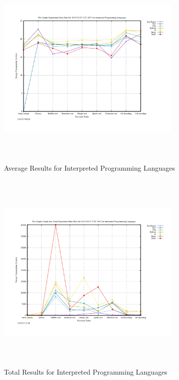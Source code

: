 \begin{figure}
	\centering
	\includegraphics[width=9cm,height=10cm,keepaspectratio]{"Graph_Experiment-Data-Mon-Jul-10-07:03:37-UTC-2017_interpreted-1"}
	\caption{Average Results for Interpreted Programming Languages}
	\label{Interpreted}
\end{figure}

\begin{figure}
	\centering
	\includegraphics[width=9cm,height=10cm,keepaspectratio]{"Graph_Graph-data-Total-Experiment-Data-Mon-Jul-10-07:03:37-UTC-2017_interpreted"}
	\caption{Total Results for Interpreted Programming Languages}
	\label{Interpreted Total}
\end{figure}

